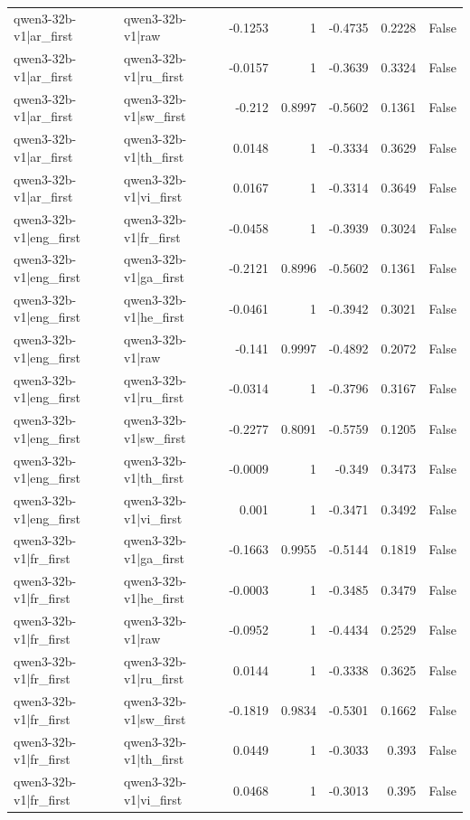 \begin{table}
\begin{tabular}{l l r r r r l}
qwen3-32b-v1|ar_first & qwen3-32b-v1|raw & -0.1253 & 1 & -0.4735 & 0.2228 & False \\
qwen3-32b-v1|ar_first & qwen3-32b-v1|ru_first & -0.0157 & 1 & -0.3639 & 0.3324 & False \\
qwen3-32b-v1|ar_first & qwen3-32b-v1|sw_first & -0.212 & 0.8997 & -0.5602 & 0.1361 & False \\
qwen3-32b-v1|ar_first & qwen3-32b-v1|th_first & 0.0148 & 1 & -0.3334 & 0.3629 & False \\
qwen3-32b-v1|ar_first & qwen3-32b-v1|vi_first & 0.0167 & 1 & -0.3314 & 0.3649 & False \\
qwen3-32b-v1|eng_first & qwen3-32b-v1|fr_first & -0.0458 & 1 & -0.3939 & 0.3024 & False \\
qwen3-32b-v1|eng_first & qwen3-32b-v1|ga_first & -0.2121 & 0.8996 & -0.5602 & 0.1361 & False \\
qwen3-32b-v1|eng_first & qwen3-32b-v1|he_first & -0.0461 & 1 & -0.3942 & 0.3021 & False \\
qwen3-32b-v1|eng_first & qwen3-32b-v1|raw & -0.141 & 0.9997 & -0.4892 & 0.2072 & False \\
qwen3-32b-v1|eng_first & qwen3-32b-v1|ru_first & -0.0314 & 1 & -0.3796 & 0.3167 & False \\
qwen3-32b-v1|eng_first & qwen3-32b-v1|sw_first & -0.2277 & 0.8091 & -0.5759 & 0.1205 & False \\
qwen3-32b-v1|eng_first & qwen3-32b-v1|th_first & -0.0009 & 1 & -0.349 & 0.3473 & False \\
qwen3-32b-v1|eng_first & qwen3-32b-v1|vi_first & 0.001 & 1 & -0.3471 & 0.3492 & False \\
qwen3-32b-v1|fr_first & qwen3-32b-v1|ga_first & -0.1663 & 0.9955 & -0.5144 & 0.1819 & False \\
qwen3-32b-v1|fr_first & qwen3-32b-v1|he_first & -0.0003 & 1 & -0.3485 & 0.3479 & False \\
qwen3-32b-v1|fr_first & qwen3-32b-v1|raw & -0.0952 & 1 & -0.4434 & 0.2529 & False \\
qwen3-32b-v1|fr_first & qwen3-32b-v1|ru_first & 0.0144 & 1 & -0.3338 & 0.3625 & False \\
qwen3-32b-v1|fr_first & qwen3-32b-v1|sw_first & -0.1819 & 0.9834 & -0.5301 & 0.1662 & False \\
qwen3-32b-v1|fr_first & qwen3-32b-v1|th_first & 0.0449 & 1 & -0.3033 & 0.393 & False \\
qwen3-32b-v1|fr_first & qwen3-32b-v1|vi_first & 0.0468 & 1 & -0.3013 & 0.395 & False \\

\end{tabular}
\end{table}

